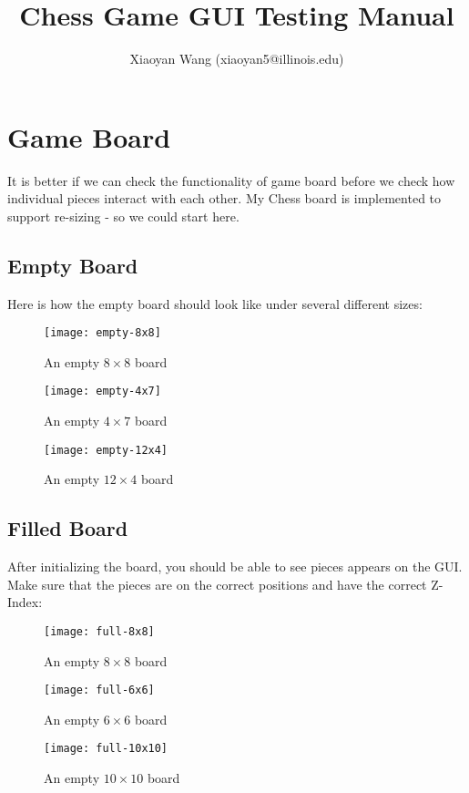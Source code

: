 \documentclass[12pt]{article}
\title{Chess Game GUI Testing Manual}
\author{Xiaoyan Wang (xiaoyan5@illinois.edu)}
\begin{document}
\maketitle

\section{Game Board}

It is better if we can check the functionality of game board before
we check how individual pieces interact with each other. My Chess board
is implemented to support re-sizing - so we could start here.

\subsection{Empty Board}

Here is how the empty board should look like under several different
sizes:

\begin{figure}[!h]
\begin{center}
\texttt{[image: empty-8x8]}
\caption{An empty $8\times 8$ board}
\end{center}
\end{figure}
\begin{figure}[!h]
\begin{center}
\texttt{[image: empty-4x7]}
\caption{An empty $4\times 7$ board}
\end{center}
\end{figure}
\begin{figure}[!h]
\begin{center}
\texttt{[image: empty-12x4]}
\caption{An empty $12\times 4$ board}
\end{center}
\end{figure}

\subsection{Filled Board}

After initializing the board, you should be able to see pieces appears on
the GUI. Make sure that the pieces are on the correct positions and
have the correct Z-Index:
\begin{figure}[!h]
\begin{center}
\texttt{[image: full-8x8]}
\caption{An empty $8\times 8$ board}
\end{center}
\end{figure}
\begin{figure}[!h]
\begin{center}
\texttt{[image: full-6x6]}
\caption{An empty $6\times 6$ board}
\end{center}
\end{figure}
\begin{figure}[!h]
\begin{center}
\texttt{[image: full-10x10]}
\caption{An empty $10\times 10$ board}
\end{center}
\end{figure}
\end{document}
